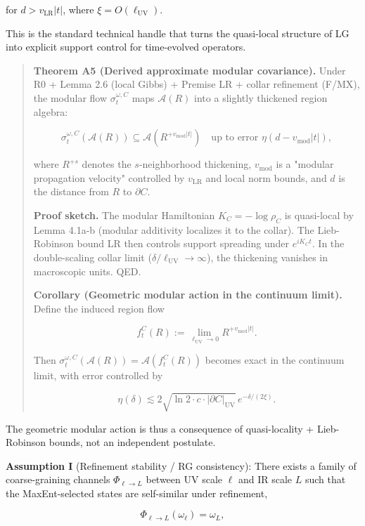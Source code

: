 for \(d > v_{\mathrm{LR}}|t|\), where \(\xi = O(\ell_{\mathrm{UV}})\).

This is the standard technical handle that turns the quasi-local structure of LG into explicit support control for time-evolved operators.

\begin{quote}
\textbf{Theorem A5 (Derived approximate modular covariance).} Under R0 + Lemma 2.6 (local Gibbs) + Premise LR + collar refinement (F/MX), the modular flow \(\sigma_t^{\omega,C}\) maps \(\mathcal{A}(R)\) into a slightly thickened region algebra:

\[
\sigma_t^{\omega,C}(\mathcal{A}(R)) \subseteq \mathcal{A}(R^{+v_{\mathrm{mod}}|t|})
\quad \text{up to error } \eta(d - v_{\mathrm{mod}}|t|),
\]

where \(R^{+s}\) denotes the \(s\)-neighborhood thickening, \(v_{\mathrm{mod}}\) is a "modular propagation velocity" controlled by \(v_{\mathrm{LR}}\) and local norm bounds, and \(d\) is the distance from \(R\) to \(\partial C\).

\textbf{Proof sketch.} The modular Hamiltonian \(K_C = -\log \rho_C\) is quasi-local by Lemma 4.1a-b (modular additivity localizes it to the collar). The Lieb-Robinson bound LR then controls support spreading under \(e^{iK_C t}\). In the double-scaling collar limit (\(\delta/\ell_{\mathrm{UV}} \to \infty\)), the thickening vanishes in macroscopic units. QED.

\textbf{Corollary (Geometric modular action in the continuum limit).} Define the induced region flow

\[
f_t^C(R) := \lim_{\ell_{\mathrm{UV}} \to 0} R^{+v_{\mathrm{mod}}|t|}.
\]

Then \(\sigma_t^{\omega,C}(\mathcal{A}(R)) = \mathcal{A}(f_t^C(R))\) becomes exact in the continuum limit, with error controlled by

\[
\eta(\delta) \lesssim 2\sqrt{\ln 2 \cdot c \cdot |\partial C|_{\mathrm{UV}}} \, e^{-\delta/(2\xi)}.
\]
\end{quote}

The geometric modular action is thus a consequence of quasi-locality + Lieb-Robinson bounds, not an independent postulate.

\textbf{Assumption I} (Refinement stability / RG consistency): There exists a family of coarse-graining channels \(\Phi_{\ell\to L}\) between UV scale \(\ell\) and IR scale \(L\) such that the MaxEnt-selected states are self-similar under refinement,

\[
\Phi_{\ell\to L}(\omega_{\ell}) = \omega_{L},
\]

